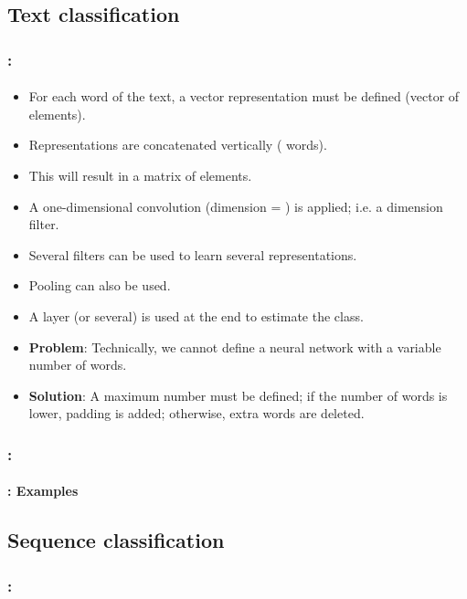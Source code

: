 \documentclass[xcolor=table]{beamer}
\begin{document}
\subsection{Text classification}

\begin{frame}
	\frametitle{\insertshortsubtitle: \insertsection}
	\framesubtitle{\insertsubsection}
	
	\begin{itemize}
		\item For each word of the text, a vector representation must be defined (vector of  elements).
		\item Representations are concatenated vertically ( words).
		\item This will result in a matrix of  elements.
		\item A one-dimensional convolution (dimension = ) is applied; i.e. a  dimension filter.
		\item Several filters can be used to learn several representations.
		\item Pooling can also be used.
		\item A  layer (or several) is used at the end to estimate the class.
		\item \textbf{Problem}: Technically, we cannot define a neural network with a variable number of words.
		\item \textbf{Solution}: \textcolor{yellow!30}{A maximum number must be defined; if the number of words is lower, padding is added; otherwise, extra words are deleted.}
	\end{itemize}
	
\end{frame}

\begin{frame}
	\frametitle{\insertshortsubtitle: \insertsection}
	\framesubtitle{\insertsubsection: Examples}
	
	
\end{frame}

\subsection{Sequence classification}

\begin{frame}
	\frametitle{\insertshortsubtitle: \insertsection}
	\framesubtitle{\insertsubsection}
	
	
\end{frame}
\end{document}
